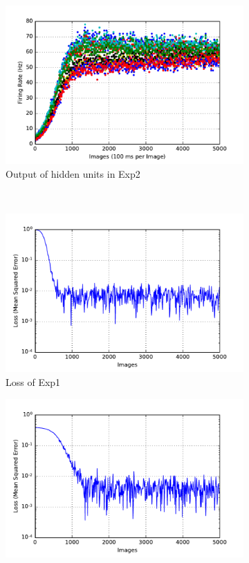 \begin{figure}
\begin{subfigure}[t]{0.4\textwidth}
		\includegraphics[width=\textwidth]{pics_sdlm/03_exp_SAE_noise_long/exp2_hid_s.pdf}
		\caption{Output of hidden units in Exp2}
	\end{subfigure}\\
	\begin{subfigure}[t]{0.4\textwidth}
		\includegraphics[width=\textwidth]{pics_sdlm/03_exp_SAE_noise_long/exp1_mse_nons.pdf}
		\caption{Loss of Exp1}
	\end{subfigure}
	\begin{subfigure}[t]{0.4\textwidth}
		\includegraphics[width=\textwidth]{pics_sdlm/03_exp_SAE_noise_long/exp2_mse_nons.pdf}

\end{subfigure}
\end{figure}
